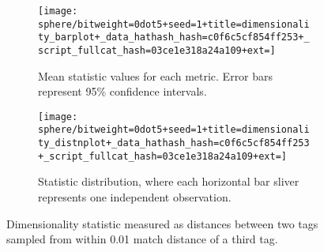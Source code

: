 \begin{figure}
\begin{center}

\begin{subfigure}[b]{\columnwidth}
\centering
\texttt{[image: sphere/bitweight=0dot5+seed=1+title=dimensionality\_barplot+\_data\_hathash\_hash=c0f6c5cf854ff253+\_script\_fullcat\_hash=03ce1e318a24a109+ext=]}
\caption{
Mean statistic values for each metric.
Error bars represent 95\% confidence intervals.
}
\label{fig:sphere_distnplot}
\end{subfigure}

\vspace{2ex}

\begin{subfigure}[b]{\columnwidth}
\centering
\texttt{[image: sphere/bitweight=0dot5+seed=1+title=dimensionality\_distnplot+\_data\_hathash\_hash=c0f6c5cf854ff253+\_script\_fullcat\_hash=03ce1e318a24a109+ext=]}
\caption{
Statistic distribution, where each horizontal bar sliver represents one independent observation.
}
\label{fig:sphere_barplot}
\end{subfigure}

\caption{
Dimensionality statistic measured as distances between two tags sampled from within 0.01 match distance of a third tag.
}
\label{fig:sphere}

\end{center}
\end{figure}
